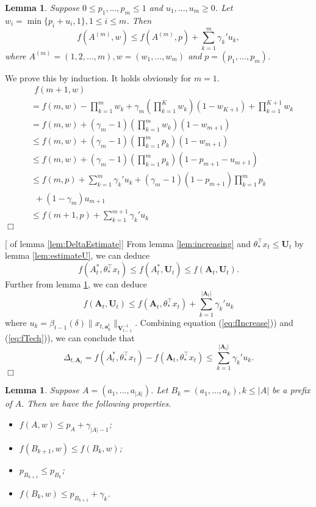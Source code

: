 \documentclass{article}
\newcommand{\bA}{\mathbf{A}}
\newcommand{\ba}{\mathbf{a}}
\newcommand{\bU}{\mathbf{U}}
\newcommand{\bV}{\mathbf{V}}
\newcommand{\abs}[1]{\left| #1 \right|}
\newcommand{\norm}[1]{\| #1 \|}
\newtheorem{lemma}[theorem]{Lemma}%
\newenvironment{proof}{\noindent {\textbf{Proof. }}}{$\Box$ \medskip}
\begin{document}
\begin{lemma}
\label{lem:estimateTech}
Suppose $0 \leq p_1,...,p_m \leq 1$ and $u_1,...,u_m \geq 0$. Let $w_i = \min\{p_i + u_i, 1\}, 1 \leq i \leq m$. Then
$$
f(A^{(m)}, w) \leq f(A^{(m)}, p) + \sum_{k=1}^{m} \gamma_k' u_k,
$$
where $A^{(m)} = (1,2,\ldots,m), w = (w_1, \ldots, w_m)$ and $p = (p_1, \ldots, p_m)$.
\end{lemma}
\begin{proof}
We prove this by induction. It holds obviously for $m=1$.
\begin{align*}
&~~f(m+1, w)\\
&= f(m, w) -\prod_{k=1}^{m} w_k + \gamma_{m}  (\prod_{k=1}^{K} w_k) (1 - w_{K+1})+ \prod_{k=1}^{K+1} w_k\\
&= f(m, w) + (\gamma_{m} - 1) (\prod_{k=1}^{m} w_k) (1 - w_{m+1})\\
&\leq f(m, w) + (\gamma_{m} - 1) (\prod_{k=1}^{m} p_k) (1 - w_{m+1})\\
&\leq f(m, w) + (\gamma_{m} - 1) (\prod_{k=1}^{m} p_k)  (1 - p_{m+1} - u_{m+1})\\
&\leq f(m, p) +  \sum_{k=1}^{m} \gamma_k' u_k + (\gamma_{m} - 1) (1 - p_{m+1}) \prod_{k=1}^{m} p_k\\
&~~ + (1 - \gamma_{m}) u_{m+1}\\
&\leq f(m+1, p) + \sum_{k=1}^{m+1} \gamma_k' u_k
\end{align*}
\end{proof}

\begin{proof}[ of lemma \ref{lem:DeltaEstimate}]
From lemma \ref{lem:increasing} and $\theta_*^{\top}x_t \leq \bU_t$ by lemma \ref{lem:estimateU}, we can deduce 
\begin{equation}
\label{eq:fIncrease}
f(A_t^*, \theta_*^{\top}x_t) \leq f(A_t^*, \bU_t) \leq f(\bA_t, \bU_t).
\end{equation}
Further from lemma \ref{lem:estimateTech}, we can deduce
\begin{equation}
\label{eq:fTech}
f(\bA_t, \bU_t) \leq f(\bA_t, \theta_*^{\top}x_t) + \sum_{k=1}^{\abs{\bA_t}} \gamma_k' u_k
\end{equation}
where $u_k = \beta_{t-1}(\delta)\norm{x_{t, \ba_k^t}}_{\bV_{t-1}^{-1}}$. Combining equation (\ref{eq:fIncrease})) and (\ref{eq:fTech})), we can conclude that
$$
\Delta_{t, \bA_t} = f(A_t^*, \theta_*^{\top}x_t) - f(\bA_t, \theta_*^{\top}x_t) \leq \sum_{k=1}^{\abs{\bA_t}} \gamma_k' u_k.
$$
\end{proof}

\begin{lemma}
Suppose $A = (a_1, ..., a_{\abs{A}})$. Let $B_k = (a_1, ..., a_k), k \leq \abs{A}$ be a prefix of $A$. Then we have the following properties.
\begin{itemize}
\item[(1)] $f(A, w) \leq p_A + \gamma_{\abs{A} - 1}$;
\item[(2)] $f(B_{k+1}, w) \leq f(B_k, w)$;
\item[(3)] $p_{B_{k+1}} \leq p_{B_k}$;
\item[(4)] $f(B_k, w) \leq p_{B_{k+1}} + \gamma_{k}$.
\end{itemize}	
\end{lemma}
\end{document}
